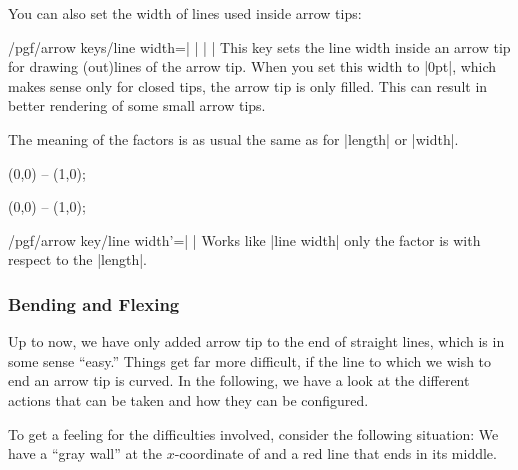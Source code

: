 You can also set the width of lines used inside arrow tips:

\begin{key}{/pgf/arrow keys/line width=| |%
    | |}
  This key sets the line width inside an arrow tip for drawing
  (out)lines of the arrow tip. When you set this width to |0pt|, which
  makes sense only for closed tips, the arrow tip is only filled. This
  can result in better rendering of some small arrow tips.

  The meaning of the factors is as usual the same as for |length| or |width|.
  
\begin{codeexample}[width=2cm]
\tikz \draw [arrows = {-Latex[line width=0.1pt, fill=white, length=10pt]}] (0,0) -- (1,0);
\end{codeexample}
\begin{codeexample}[width=2cm]
\tikz \draw [arrows = {-Latex[line width=1pt, fill=white, length=10pt]}] (0,0) -- (1,0);
\end{codeexample}
\end{key}


\begin{key}{/pgf/arrow key/line width'=| |}
  Works like |line width| only the factor is with respect to the |length|.  
\end{key}

\subsubsection{Bending and Flexing}

\label{section-arrow-flex}

Up to now, we have only added arrow tip to the end of straight lines,
which is in some sense ``easy.'' Things get far more difficult, if the
line to which we wish to end an arrow tip is curved. In the following,
we have a look at the different actions that can be taken and how they
can be configured.

To get a feeling for the difficulties involved, consider the following
situation: We have a ``gray wall'' at the $x$-coordinate of and a
red line that ends in its middle.

\begin{codeexample}[]
\def\wall{ \fill     [fill=black!50]  (1,-.5) rectangle (2,.5);
           \pattern  [pattern=bricks] (1,-.5) rectangle (2,.5);
           \draw     [line width=1pt]  (1cm+.5pt,-.5) -- ++(0,1); }
\end{codeexample}

